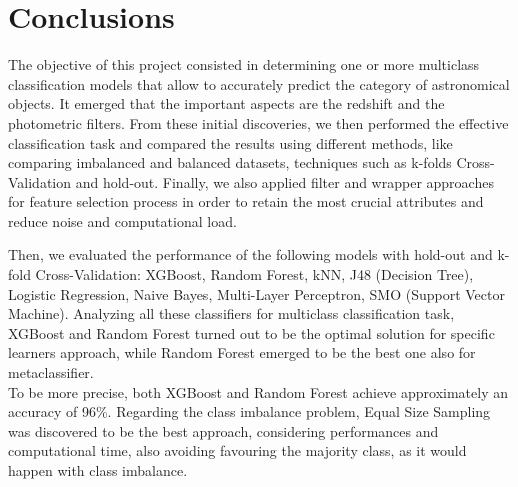 \section{Conclusions}

The objective of this project consisted in determining one or more multiclass classification models that allow to accurately predict the category of astronomical objects. 
It emerged that the important aspects are the redshift and the photometric filters. From these initial discoveries, we then performed the effective classification task and compared the results using different methods, like comparing imbalanced and balanced datasets, techniques such as k-folds Cross-Validation and hold-out. Finally, we also applied filter and wrapper approaches for feature selection process in order to retain the most crucial attributes and reduce noise and computational load.

Then, we evaluated the performance of the following models with hold-out and k-fold Cross-Validation: XGBoost, Random Forest, kNN, J48 (Decision Tree), Logistic Regression, Naive Bayes, Multi-Layer Perceptron, SMO (Support Vector Machine). Analyzing all these classifiers for multiclass classification task, XGBoost and Random Forest turned out to be the optimal solution for specific learners approach, while Random Forest emerged to be the best one also for metaclassifier.\\
To be more precise, both XGBoost and Random Forest achieve approximately an accuracy of 96\%.
Regarding the class imbalance problem, Equal Size Sampling was discovered to be the best approach, considering performances and computational time, also avoiding favouring the majority class, as it would happen with class imbalance.

